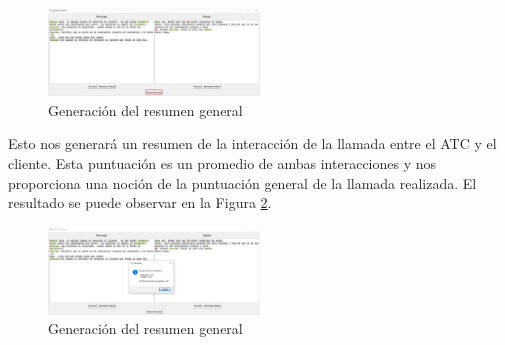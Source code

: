 \documentclass[10pt,times,twocolumn]{article}
\begin{document}
\begin{figure}[H]
    \centering
    \includegraphics[width=0.5\textwidth]{fig/resumen_general.png}
    \caption{Generación del resumen general}
    \label{fig:graf_resumen_general}
\end{figure}

Esto nos generará un resumen de la interacción de la llamada entre el ATC y el cliente. Esta puntuación es un promedio de ambas interacciones y nos proporciona una noción de la puntuación general de la llamada realizada. El resultado se puede observar en la Figura \ref{fig:graf_resultado_general}.

\begin{figure}[H]
    \centering
    \includegraphics[width=0.5\textwidth]{fig/resultado_general.png}
    \caption{Generación del resumen general}
    \label{fig:graf_resultado_general}
\end{figure}

\printbibliography
\end{document}
